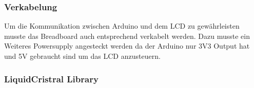 \documentclass{scrartcl}
\begin{document}

\subsubsection{Verkabelung}


Um die Kommunikation zwischen Arduino und dem LCD zu gewährleisten musste das Breadboard auch entsprechend verkabelt werden. Dazu musste ein Weiteres Powersupply angesteckt werden da der Arduino nur 3V3 Output hat und 5V gebraucht sind um das LCD anzusteuern.


\subsubsection{LiquidCristral Library}

%
%
\end{document}

